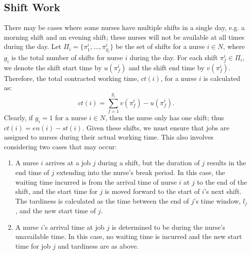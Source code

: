 \documentclass[a4paper,11pt,authoryear]{elsarticle}
\begin{document}
\subsection{Shift Work}
\label{sub:shiftwork}
\noindent There may be cases where some nurses have multiple shifts in a single day, e.g. a morning shift and an evening shift; these nurses will not be available at all times during the day. Let $\Pi_i = \{\pi_1^i,\dotsc, \pi_{g_i}^i\}$ be the set of shifts for a nurse $i \in N$, where $g_i$ is the total number of shifts for nurse $i$ during the day. For each shift $\pi_f^i \in \Pi_i$, we denote the shift start time by $u(\pi_f^i)$ and the shift end time by $v(\pi_f^i)$. Therefore, the total contracted working time, $ct(i)$, for a nurse $i$ is calculated as:
\begin{equation}
	ct(i) = \displaystyle\sum_{f=1}^{g_i} v(\pi_f^i) - u(\pi_f^i). \label{eq:contractedworkingtime}
\end{equation}
\noindent Clearly, if $g_i = 1$ for a nurse $i \in N$, then the nurse only has one shift; thus $ct(i) = en(i)-st(i)$. Given these shifts, we must ensure that jobs are assigned to nurses during their actual working time. This also involves considering two cases that may occur:
\begin{enumerate}[label={(\arabic*)}]
	\item A nurse $i$ arrives at a job $j$ during a shift, but the duration of $j$ results in the end time of $j$ extending into the nurse's break period. In this case, the waiting time incurred is from the arrival time of nurse $i$ at $j$ to the end of the shift, and the start time for $j$ is moved forward to the start of $i$'s next shift. The tardiness is calculated as the time between the end of $j$'s time window, $l_j$, and the new start time of $j$.
	\item A nurse $i$'s arrival time at job $j$ is determined to be during the nurse's unavailable time. In this case, no waiting time is incurred and the new start time for job $j$ and tardiness are as above.
\end{enumerate}
\end{document}

